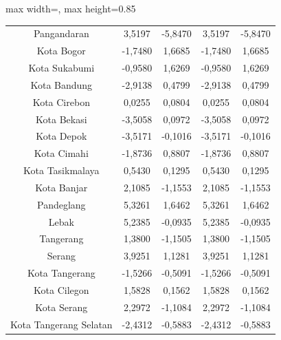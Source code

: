 \begin{table}[H]
\begin{adjustbox}{max width=\textwidth, max height=0.85\textheight}
\begin{tabular}{|c|c|c|c|c|}
Pangandaran & 3,5197 & -5,8470 & 3,5197 & -5,8470 \\
Kota Bogor & -1,7480 & 1,6685 & -1,7480 & 1,6685 \\
Kota Sukabumi & -0,9580 & 1,6269 & -0,9580 & 1,6269 \\
Kota Bandung & -2,9138 & 0,4799 & -2,9138 & 0,4799 \\
Kota Cirebon & 0,0255 & 0,0804 & 0,0255 & 0,0804 \\
Kota Bekasi & -3,5058 & 0,0972 & -3,5058 & 0,0972 \\
Kota Depok & -3,5171 & -0,1016 & -3,5171 & -0,1016 \\
Kota Cimahi & -1,8736 & 0,8807 & -1,8736 & 0,8807 \\
Kota Tasikmalaya & 0,5430 & 0,1295 & 0,5430 & 0,1295 \\
Kota Banjar & 2,1085 & -1,1553 & 2,1085 & -1,1553 \\
Pandeglang & 5,3261 & 1,6462 & 5,3261 & 1,6462 \\
Lebak & 5,2385 & -0,0935 & 5,2385 & -0,0935 \\
Tangerang & 1,3800 & -1,1505 & 1,3800 & -1,1505 \\
Serang & 3,9251 & 1,1281 & 3,9251 & 1,1281 \\
Kota Tangerang & -1,5266 & -0,5091 & -1,5266 & -0,5091 \\
Kota Cilegon & 1,5828 & 0,1562 & 1,5828 & 0,1562 \\
Kota Serang & 2,2972 & -1,1084 & 2,2972 & -1,1084 \\
Kota Tangerang Selatan & -2,4312 & -0,5883 & -2,4312 & -0,5883 \\
\hline
\end{tabular}
\end{adjustbox}
\end{table}